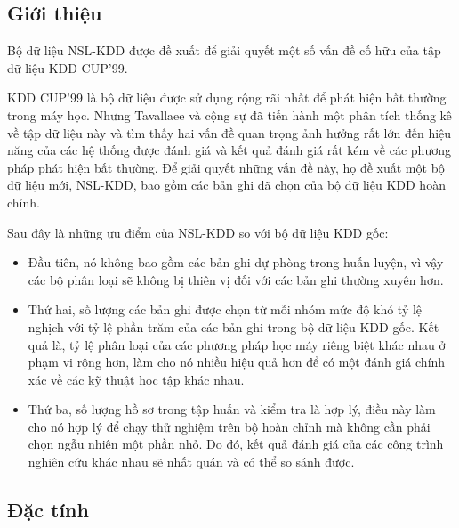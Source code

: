 \subsection{Giới thiệu}
Bộ dữ liệu NSL-KDD được đề xuất để giải quyết một số vấn đề cố hữu của tập dữ liệu KDD CUP'99.
\par
KDD CUP’99 là bộ dữ liệu được sử dụng rộng rãi nhất để phát hiện bất thường trong máy học.
Nhưng Tavallaee và cộng sự đã tiến hành một phân tích thống kê về tập dữ liệu này và tìm thấy hai vấn đề quan trọng ảnh hưởng rất lớn đến hiệu năng của các hệ thống được đánh giá và kết quả đánh giá rất kém về các phương pháp phát hiện bất thường.
Để giải quyết những vấn đề này, họ đề xuất một bộ dữ liệu mới, NSL-KDD, bao gồm các bản ghi đã chọn của bộ dữ liệu KDD hoàn chỉnh.
\newline
\par
Sau đây là những ưu điểm của NSL-KDD so với bộ dữ liệu KDD gốc:
\par
\begin{itemize}
	\item Đầu tiên, nó không bao gồm các bản ghi dự phòng trong huấn luyện, vì vậy các bộ phân loại sẽ không bị thiên vị đối với các bản ghi thường xuyên hơn.
	\item Thứ hai, số lượng các bản ghi được chọn từ mỗi nhóm mức độ khó tỷ lệ nghịch với tỷ lệ phần trăm của các bản ghi trong bộ dữ liệu KDD gốc.
	      Kết quả là, tỷ lệ phân loại của các phương pháp học máy riêng biệt khác nhau ở phạm vi rộng hơn, làm cho nó nhiều hiệu quả hơn để có một đánh giá chính xác về các kỹ thuật học tập khác nhau.
	\item Thứ ba, số lượng hồ sơ trong tập huấn và kiểm tra là hợp lý, điều này làm cho nó hợp lý để chạy thử nghiệm trên bộ hoàn chỉnh mà không cần phải chọn ngẫu nhiên một phần nhỏ. Do đó, kết quả đánh giá của các công trình nghiên cứu khác nhau sẽ nhất quán và có thể so sánh được.
\end{itemize}
\subsection{Đặc tính}

